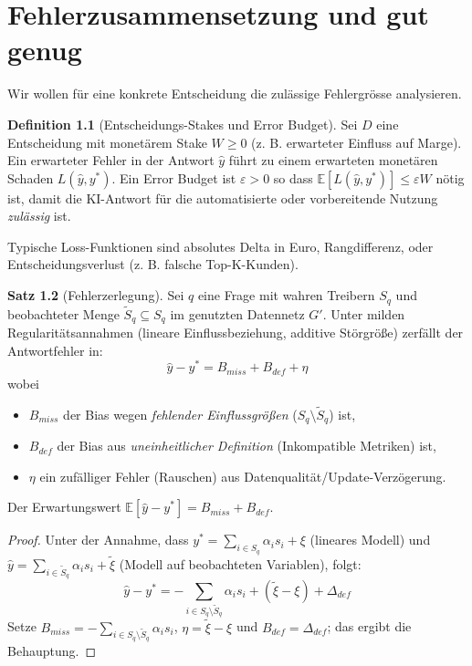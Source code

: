 \documentclass[a4paper,12pt,twoside]{report}
\theoremstyle{definition}
\newtheorem{definition}{Definition}[chapter]
\newtheorem{satz}[definition]{Satz}
\newcommand{\E}{\mathbb{E}}
\begin{document}
\chapter{Fehlerzusammensetzung und gut genug}
\label{sec:error}
Wir wollen für eine konkrete Entscheidung die zulässige Fehlergrösse analysieren.

\begin{definition}[Entscheidungs-Stakes und Error Budget]
Sei $D$ eine Entscheidung mit monetärem Stake $W\ge0$ (z. B. erwarteter Einfluss auf Marge). Ein erwarteter Fehler in der Antwort $\hat y$ führt zu einem erwarteten monetären Schaden $L(\hat y,y^*)$. Ein Error Budget ist $\varepsilon>0$ so dass $\E[L(\hat y,y^*)]\le\varepsilon W$ nötig ist, damit die KI-Antwort für die automatisierte oder vorbereitende Nutzung \emph{zulässig} ist.
\end{definition}

Typische Loss-Funktionen sind absolutes Delta in Euro, Rangdifferenz, oder Entscheidungsverlust (z. B. falsche Top-K-Kunden).

\begin{satz}[Fehlerzerlegung]
Sei $q$ eine Frage mit wahren Treibern $S_q$ und beobachteter Menge $\tilde S_q\subseteq S_q$ im genutzten Datennetz $G'$. Unter milden Regularitätsannahmen (lineare Einflussbeziehung, additive Störgröße) zerfällt der Antwortfehler in:
\[
\hat y - y^* = B_{miss} + B_{def} + \eta
\]
wobei
\begin{itemize}
\item $B_{miss}$ der Bias wegen \emph{fehlender Einflussgrößen} ($S_q\setminus\tilde S_q$) ist,
\item $B_{def}$ der Bias aus \emph{uneinheitlicher Definition} (Inkompatible Metriken) ist,
\item $\eta$ ein zufälliger Fehler (Rauschen) aus Datenqualität/Update-Verzögerung.
\end{itemize}
Der Erwartungswert $\E[\hat y - y^*] = B_{miss}+B_{def}$.
\end{satz}
\begin{proof}
Unter der Annahme, dass $y^*=\sum_{i\in S_q} \alpha_i s_i + \xi$ (lineares Modell) und $\hat y=\sum_{i\in\tilde S_q}\alpha_i s_i + \tilde\xi$ (Modell auf beobachteten Variablen), folgt:
\[
\hat y-y^*= -\sum_{i\in S_q\setminus\tilde S_q} \alpha_i s_i + (\tilde\xi-\xi) + \Delta_{def}
\]
Setze $B_{miss}=-\sum_{i\in S_q\setminus\tilde S_q}\alpha_i s_i$, $\eta=\tilde\xi-\xi$ und $B_{def}=\Delta_{def}$; das ergibt die Behauptung.
\end{proof}
\end{document}
